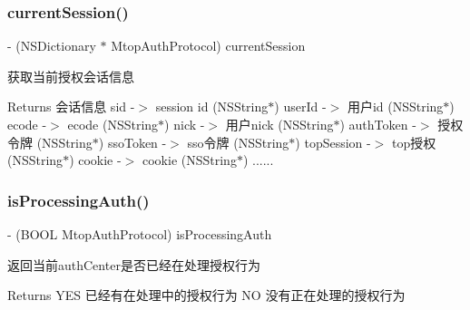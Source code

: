 \subsubsection{\texorpdfstring{current\+Session()}{currentSession()}}
{\footnotesize\ttfamily -\/ (N\+S\+Dictionary $\ast$ Mtop\+Auth\+Protocol) current\+Session \begin{DoxyParamCaption}{ }\end{DoxyParamCaption}\hspace{0.3cm}{\ttfamily [required]}}

获取当前授权会话信息 \begin{DoxyReturn}{Returns}
会话信息 sid -\/$>$ session id (N\+S\+String$\ast$) user\+Id -\/$>$ 用户id (N\+S\+String$\ast$) ecode -\/$>$ ecode (N\+S\+String$\ast$) nick -\/$>$ 用户nick (N\+S\+String$\ast$) auth\+Token -\/$>$ 授权令牌 (N\+S\+String$\ast$) sso\+Token -\/$>$ sso令牌 (N\+S\+String$\ast$) top\+Session -\/$>$ top授权 (N\+S\+String$\ast$) cookie -\/$>$ cookie (N\+S\+String$\ast$) ...... 
\end{DoxyReturn}
\mbox{\label{protocol_mtop_auth_protocol_01-p_a9bb8d09ce1a17e670edd7d28f57c8b31}} 
\subsubsection{\texorpdfstring{is\+Processing\+Auth()}{isProcessingAuth()}}
{\footnotesize\ttfamily -\/ (B\+O\+OL Mtop\+Auth\+Protocol) is\+Processing\+Auth \begin{DoxyParamCaption}{ }\end{DoxyParamCaption}\hspace{0.3cm}{\ttfamily [required]}}

返回当前auth\+Center是否已经在处理授权行为 \begin{DoxyReturn}{Returns}
Y\+ES 已经有在处理中的授权行为 NO 没有正在处理的授权行为 
\end{DoxyReturn}
\mbox{\label{protocol_mtop_auth_protocol_01-p_a4f8603bfb09ac35ab57b1c0648e4a7b4}} 
